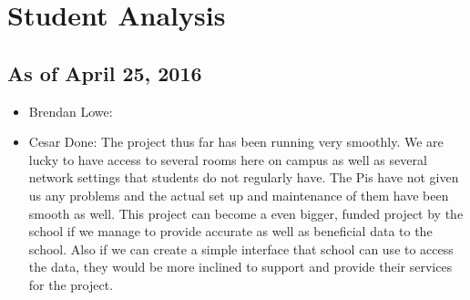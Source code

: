 \documentclass{article}
\begin{document}
	\newpage
	\section{Student Analysis}\label{sec:analysis}
		\subsection{As of April 25, 2016}
			\begin{itemize}
				\item Brendan Lowe:
				\item Cesar Done: The project thus far has been running very smoothly. We are lucky to have access to several rooms here on campus as well 
								  as several network settings that students do not regularly have. The Pis have not given us any problems and the actual set 
								  up and maintenance of them have been smooth as well. This project can  become a even bigger, funded project by the school
								   if we manage to provide accurate as well as beneficial data to the school. Also if we can create a simple interface that 
								   school can use to access the data, they would be more inclined to support and provide their services for the project. 
							

\end{itemize}
\end{document}
